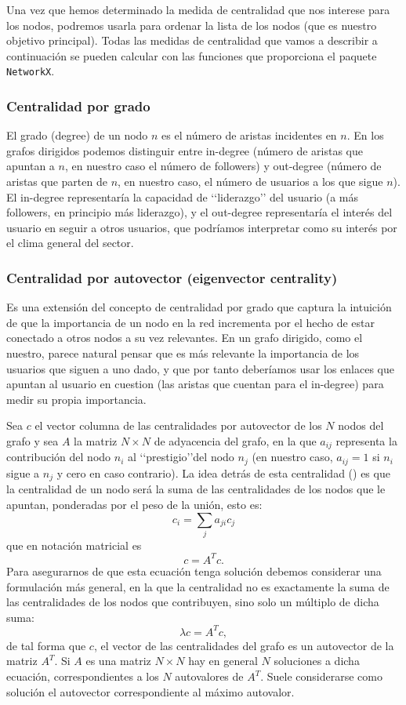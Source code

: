 Una vez que hemos determinado la medida de centralidad que nos interese para los nodos,
podremos usarla para ordenar la lista de los nodos (que es nuestro objetivo principal).
Todas las medidas de centralidad que vamos a describir
a continuación se pueden calcular con las funciones que proporciona el
paquete {\tt NetworkX}.

\subsubsection{Centralidad por grado}
El grado (degree) de un nodo $n$ es el número de aristas 
incidentes en $n$. En los grafos dirigidos podemos distinguir entre in-degree (número
de aristas que apuntan a $n$, en nuestro caso el número de followers) y
out-degree (número de aristas que parten de $n$, en nuestro caso, el número de
usuarios a los que sigue $n$). El in-degree representaría la capacidad de 
\lq\lq liderazgo\rq\rq
del usuario (a más followers, en principio más liderazgo), y el out-degree 
representaría el interés del usuario en seguir a otros usuarios, que podríamos
interpretar como su interés por el clima general del sector.

\subsubsection{Centralidad por autovector (eigenvector centrality)}
Es una extensión del 
concepto de cen\-tra\-li\-dad por grado que captura la intuición de que la importancia 
de un nodo en la red incrementa por el hecho de estar conectado a otros nodos 
a su vez relevantes. En un grafo dirigido, como el nuestro, parece natural pensar que
es más relevante la importancia de los usuarios que siguen a uno dado,
y que por tanto deberíamos usar los enlaces que apuntan al usuario en cuestion (las 
aristas que cuentan para el in-degree) para medir su propia importancia. 

Sea $c$ el vector columna
de las centralidades por autovector de los $N$ nodos del grafo y sea $A$ la matriz $N\times N$
de adyacencia del grafo, en la que $a_{ij}$ representa la contribución
del nodo $n_i$ al \lq\lq prestigio\rq\rq del nodo $n_j$ (en nuestro caso, $a_{ij} = 1$ si
$n_i$ sigue a $n_j$ y cero en caso contrario). La idea detrás de esta centralidad
(\cite{bonacich2}) es que la centralidad de un nodo será la suma de las centralidades
de los nodos que le apuntan, ponderadas por el peso de la unión, esto es:
$$c_i = \sum_j a_{ji} c_j$$
que en notación matricial es 
$$c = A^Tc.$$
Para asegurarnos de que esta ecuación tenga solución debemos considerar una formulación más general,
en la que la centralidad no es exactamente la suma de las centralidades de los nodos que 
contribuyen, sino solo un múltiplo de dicha suma:
$$\lambda c = A^Tc,$$
de tal forma que $c$, el vector de las centralidades del grafo es un 
autovector de la matriz $A^T$. Si $A$ es una matriz $N\times N$ hay en general $N$ soluciones
a dicha ecuación, correspondientes a los $N$ autovalores de $A^T$. Suele considerarse
como solución el autovector correspondiente al máximo autovalor.
 
